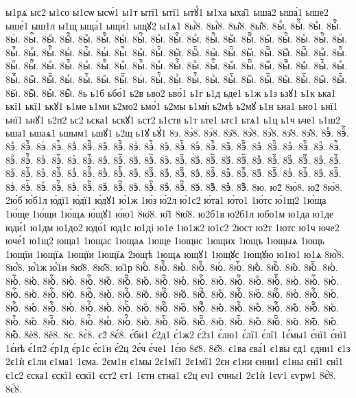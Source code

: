 {ы1рѧ
ыс2
ы1со
ы1сѡ
ысѡ́1
ы1т
ытї1
ытї1
ытꙋ́1
ы1ха
ыха̑1
ыша2
ыша́1
ыше2
ыше́1
ыш1л
ы1щ
ыща́1
ыщи́1
ыщꙋ2
ы1ѧ1
8ы҆̀8.
8ы҆́8.
8ы҆̈8.
8ы҆̑8.
8ыⷠ.
8ыⷠ҇.
8ыⷡ.
8ыⷡ҇.
8ыⷢ.
8ыⷢ҇.
8ыⷣ.
8ыⷣ҇.
8ыⷤ.
8ыⷤ҇.
8ыⷥ.
8ыⷥ҇.
8ыⷦ.
8ыⷦ҇.
8ыⷧ.
8ыⷧ҇.
8ыⷨ.
8ыⷨ҇.
8ыⷩ.
8ыⷩ҇.
8ыⷪ.
8ыⷪ҇.
8ыⷫ.
8ыⷫ҇.
8ыⷬ.
8ыⷬ҇.
8ыⷭ.
8ыⷭ҇.
8ыⷮ.
8ыⷮ҇.
8ыⷯ.
8ыⷯ҇.
8ыⷰ.
8ыⷰ҇.
8ыⷱ.
8ыⷱ҇.
8ыⷲ.
8ыⷲ҇.
8ыⷳ.
8ыⷳ҇.
8ыⷴ.
8ыⷴ҇.
8ыⷵ.
8ыⷵ҇.
8ыⷶ.
8ыⷶ҇.
8ыⷷ.
8ыⷷ҇.
8ыⷸ.
8ыⷸ҇.
8ыⷹ.
8ыⷹ҇.
8ыⷺ.
8ыⷺ҇.
8ыⷻ.
8ыⷻ҇.
8ыⷼ.
8ыⷼ҇.
8ыⷽ.
8ыⷽ҇.
8ыⷾ.
8ыⷾ҇.
8ыⷿ.
8ыⷿ҇.
8ыꙴ.
8ыꙴ҇.
8ыꙵ.
8ыꙵ҇.
8ыꙶ.
8ыꙶ҇.
8ыꙷ.
8ыꙷ҇.
8ыꙸ.
8ыꙸ҇.
8ыꙹ.
8ыꙹ҇.
8ыꙺ.
8ыꙺ҇.
8ыꙻ.
8ыꙻ҇.
8ы꙼.
8ы꙼҇.
8ы꙽.
8ы꙽҇.
8ь
ь1б
ьбо́1
ь2в
ьво2
ьво́1
ь1г
ь1д
ьде1
ь1ж
ь1з
ьзꙋ1
ь1к
ька1
ькї1
ькї1
ькꙋ1
ь1ме
ь1ми
ь2мо2
ьмо́1
ь2мы
ь1мѝ
ь2мѣ
ь2мꙋ
ь1н
ьна1
ьно1
ьнї1
ьнї1
ьнꙋ1
ь2п2
ьс2
ьска1
ьскꙋ1
ьст2
ь1ств
ь1т
ьте1
ьтє1
ьтѧ1
ь1ц
ь1ч
ьче1
ь1ш2
ьша1
ьшаѧ1
ьшым1
ьшꙋ1
ь2щ
ь1ꙋ
ьꙋ́1
8э.
8э̀8.
8э́8.
8э̑8.
8э҆̀8.
8э҆́8.
8э҆̈8.
8э҆̑8.
8эⷠ.
8эⷠ҇.
8эⷡ.
8эⷡ҇.
8эⷢ.
8эⷢ҇.
8эⷣ.
8эⷣ҇.
8эⷤ.
8эⷤ҇.
8эⷥ.
8эⷥ҇.
8эⷦ.
8эⷦ҇.
8эⷧ.
8эⷧ҇.
8эⷨ.
8эⷨ҇.
8эⷩ.
8эⷩ҇.
8эⷪ.
8эⷪ҇.
8эⷫ.
8эⷫ҇.
8эⷬ.
8эⷬ҇.
8эⷭ.
8эⷭ҇.
8эⷮ.
8эⷮ҇.
8эⷯ.
8эⷯ҇.
8эⷰ.
8эⷰ҇.
8эⷱ.
8эⷱ҇.
8эⷲ.
8эⷲ҇.
8эⷳ.
8эⷳ҇.
8эⷴ.
8эⷴ҇.
8эⷵ.
8эⷵ҇.
8эⷶ.
8эⷶ҇.
8эⷷ.
8эⷷ҇.
8эⷸ.
8эⷸ҇.
8эⷹ.
8эⷹ҇.
8эⷺ.
8эⷺ҇.
8эⷻ.
8эⷻ҇.
8эⷼ.
8эⷼ҇.
8эⷽ.
8эⷽ҇.
8эⷾ.
8эⷾ҇.
8эⷿ.
8эⷿ҇.
8эꙴ.
8эꙴ҇.
8эꙵ.
8эꙵ҇.
8эꙶ.
8эꙶ҇.
8эꙷ.
8эꙷ҇.
8эꙸ.
8эꙸ҇.
8эꙹ.
8эꙹ҇.
8эꙺ.
8эꙺ҇.
8эꙻ.
8эꙻ҇.
8э꙼.
8э꙼҇.
8э꙽.
8э꙽҇.
8ю.
ю2̀
8ю̀8.
ю2́
8ю́8.
2ю́б
ю́б1л
ю́дї1
ю́дї1
ю́дꙋ1
ю́1ж
1ю́з
ю́2л
ю́1с2
ю́та1
ю́то1
1ю́тс
ю́1щ2
1ю́ща
1ю́ще
1ю́щи
1ю́щѧ
ю́щꙋ1
ю́ю1
8ю̈8.
ю̑1
8ю̑8.
ю2б1в
ю2б1л
юбо1м
ю1да
ю1де
юди́1
ю1дм
ю1до2
юдо́1
юд1с
ю1ді
ю1е
1ю1ж2
ю1с2
2юст
ю2т
1ютс
ю1ч
юче2
юче́1
ю1щ2
юща1
1ющас
1ющаѧ
1юще
1ющис
1ющих
1ющъ
1ющыѧ
1ющь
1ющїи
1ющїѧ
1ющїи
1ющїѧ
2ющѣ
1ющѧ
ющꙋ1
1ющꙋс
1ющꙋю
ю1ю1
ю1ѧ
8ю҆̀8.
8ю҆́8.
ю҆́1ж
ю҆́1н
8ю҆̈8.
8ю҆̑8.
ю҆1р
8юⷠ.
8юⷠ҇.
8юⷡ.
8юⷡ҇.
8юⷢ.
8юⷢ҇.
8юⷣ.
8юⷣ҇.
8юⷤ.
8юⷤ҇.
8юⷥ.
8юⷥ҇.
8юⷦ.
8юⷦ҇.
8юⷧ.
8юⷧ҇.
8юⷨ.
8юⷨ҇.
8юⷩ.
8юⷩ҇.
8юⷪ.
8юⷪ҇.
8юⷫ.
8юⷫ҇.
8юⷬ.
8юⷬ҇.
8юⷭ.
8юⷭ҇.
8юⷮ.
8юⷮ҇.
8юⷯ.
8юⷯ҇.
8юⷰ.
8юⷰ҇.
8юⷱ.
8юⷱ҇.
8юⷲ.
8юⷲ҇.
8юⷳ.
8юⷳ҇.
8юⷴ.
8юⷴ҇.
8юⷵ.
8юⷵ҇.
8юⷶ.
8юⷶ҇.
8юⷷ.
8юⷷ҇.
8юⷸ.
8юⷸ҇.
8юⷹ.
8юⷹ҇.
8юⷺ.
8юⷺ҇.
8юⷻ.
8юⷻ҇.
8юⷼ.
8юⷼ҇.
8юⷽ.
8юⷽ҇.
8юⷾ.
8юⷾ҇.
8юⷿ.
8юⷿ҇.
8юꙴ.
8юꙴ҇.
8юꙵ.
8юꙵ҇.
8юꙶ.
8юꙶ҇.
8юꙷ.
8юꙷ҇.
8юꙸ.
8юꙸ҇.
8юꙹ.
8юꙹ҇.
8юꙺ.
8юꙺ҇.
8юꙻ.
8юꙻ҇.
8ю꙼.
8ю꙼҇.
8ю꙽.
8ю꙽҇.
8ѐ8.
8ё8.
8є.
8є̀8.
є2́
8є́8.
є́би1
є́2д1
є́1ж2
є́2з1
є́лю1
є́лї1
є́лї1
1є́мы1
є́нї1
є́нї1
1є́нѣ
є́1п2
є́р1д
є́р1с
є́с1н
є́2ц
2є́ч
є́че1
1є́ю
8є̈8.
8є̑8.
є1ва
єва́1
є1вы
єд1
єдни1
є1з
2є1ѝ
є1ли
є1ма1
1єма.
2єм1н
є1мы
2є1мї1
2є1мї1
2єн
є1ни
єнни1
є1ны
єнї1
єнї1
є1с2
єска1
єскї1
єскї1
єст2
єт1
1єтн
єтна1
є2ц
єч1
єчны1
2є1ѝ
1єѵ1
єѵрѡ1
8є҆̀8.
8є҆́8.
}
